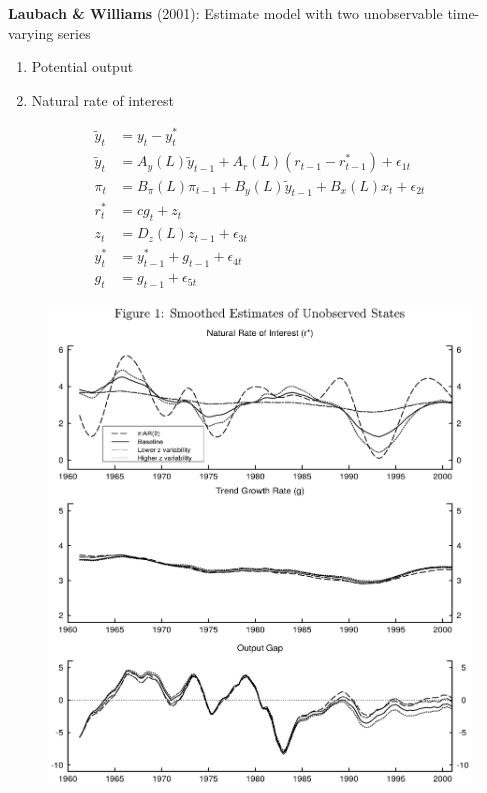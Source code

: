 \documentclass{beamer}
\begin{document}
\begin{frame}
  \textbf{Laubach \& Williams} (2001): Estimate model with two unobservable time-varying series
  \begin{enumerate}
    \item Potential output
    \item Natural rate of interest
  \end{enumerate}
  \begin{align*}
    \tilde{y}_t &= y_t-y^*_t \\ 
    \tilde{y}_t &= A_y(L)\tilde{y}_{t-1} + A_r(L)(r_{t-1}-r^*_{t-1}) + \epsilon_{1t}\\
    \pi_t &= B_{\pi}(L)\pi_{t-1} + B_y(L)\tilde{y}_{t-1} + B_x(L)x_t + \epsilon_{2t}\\
    r^*_t &= cg_t +z_t\\
    z_t &= D_z(L)z_{t-1} + \epsilon_{3t}\\
    y^*_t &= y^*_{t-1} +g_{t-1} + \epsilon_{4t}\\
    g_t &= g_{t-1} + \epsilon_{5t}
  \end{align*}
\end{frame}

\begin{frame}
  \begin{figure}
    \includegraphics[scale=.5]{lw.eps}
  \end{figure}
\end{frame}
\end{document}
